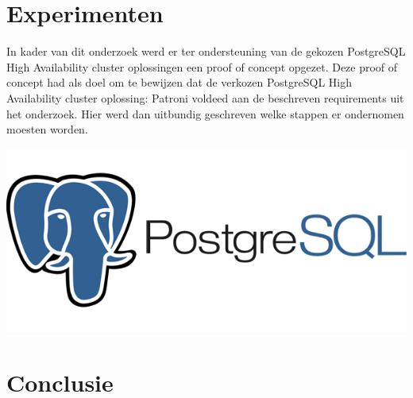 \documentclass[a0,portrait]{a0poster}
\begin{document}
\begin{multicols}{2}

\color{Black} %
\color{HoGentAccent1} 
\section*{Experimenten}
\color{black}
In kader van dit onderzoek werd er ter ondersteuning van de gekozen PostgreSQL High Availability cluster oplossingen een proof of concept opgezet. Deze proof of concept had als doel om te bewijzen dat de verkozen PostgreSQL High Availability cluster oplossing: Patroni voldeed aan de beschreven requirements uit het onderzoek.
Hier werd dan uitbundig geschreven welke stappen er ondernomen moesten worden.




\begin{center}\vspace{1cm}
\includegraphics[width=1.0\linewidth]{postgres}
\end{center}\vspace{1cm}




\color{HoGentAccent1} 
\section*{Conclusie}
\color{black}


\end{multicols}
\end{document}
